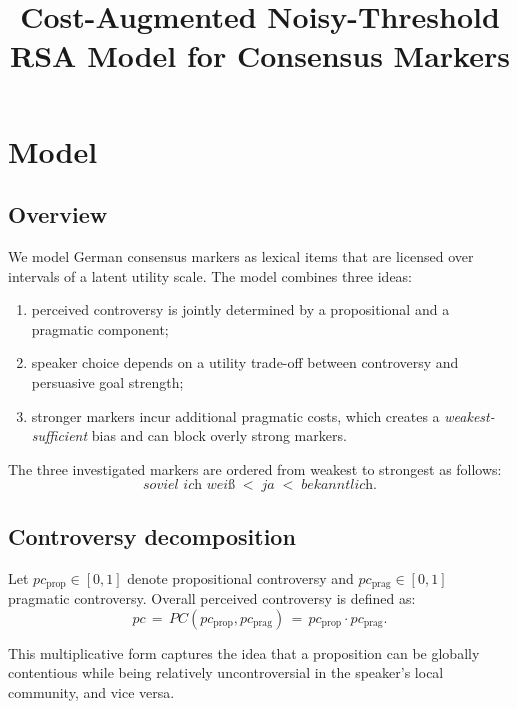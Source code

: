 \documentclass[12pt]{article}
\title{Cost-Augmented Noisy-Threshold RSA Model for Consensus Markers}
\author{}
\date{}
\begin{document}

\section{Model}

\subsection{Overview}

We model German consensus markers as lexical items that are licensed over
intervals of a latent utility scale. The model combines three ideas:
\begin{enumerate}
  \item perceived controversy is jointly determined by a propositional and a pragmatic component;
  \item speaker choice depends on a utility trade-off between controversy and persuasive goal strength;
  \item stronger markers incur additional pragmatic costs, which creates a
        \emph{weakest-sufficient} bias and can block overly strong markers.
\end{enumerate}

The three investigated markers are ordered from weakest to strongest as
follows:
\[
\textit{soviel ich wei\ss}
\;<\;
\textit{ja}
\;<\;
\textit{bekanntlich}.
\]

\subsection{Controversy decomposition}

Let
$pc_{\text{prop}} \in [0,1]$ denote propositional controversy and
$pc_{\text{prag}} \in [0,1]$ pragmatic controversy. Overall perceived
controversy is defined as:
\begin{equation}
pc \,=\, PC(pc_{\text{prop}}, pc_{\text{prag}})
\,=\,
pc_{\text{prop}} \cdot pc_{\text{prag}}.
\end{equation}

This multiplicative form captures the idea that a proposition can be globally
contentious while being relatively uncontroversial in the speaker's local
community, and vice versa.
\end{document}
